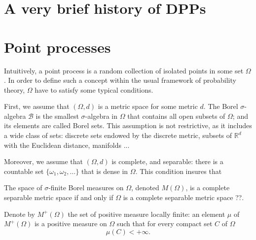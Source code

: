 \documentclass[twoside,11pt]{book}
\numberwithin{theorem}{chapter}
\numberwithin{definition}{chapter}
\numberwithin{proposition}{chapter}
\numberwithin{corollary}{chapter}
\numberwithin{example}{chapter}
\numberwithin{lemma}{chapter}
\begin{document}
\section{A very brief history of DPPs} 

\section{Point processes}\label{sec:pointprocesses}

Intuitively, a point process is a random collection of isolated points in some set $\Omega$. In order to define such a concept within the usual framework of probability theory, $\Omega$ have to satisfy some typical conditions. 

First, we assume that $(\Omega,d)$ is a metric space for some metric $d$. The Borel $\sigma$-algebra $\mathcal{B}$ is the smallest $\sigma$-algebra in $\Omega$ that contains all open subsets of $\Omega$; and its elements are called Borel sets. This assumption is not restrictive, as it includes a wide class of sets: discrete sets endowed by the discrete metric, subsets of $\mathbb{R}^{d}$ with the Euclidean distance, manifolds ... 

Moreover, we assume that $(\Omega,d)$ is complete, and separable: there is a countable set $\{\omega_{1}, \omega_{2}, \dots \}$ that is dense in $\Omega$. This condition insures that 



The space of $\sigma$-finite Borel measures on $\Omega$, denoted $M(\Omega)$, is a complete separable metric space if and only if $\Omega$ is a complete separable metric space \citep{Par05}??.


Denote by $M^{+}(\Omega)$ the set of positive measure locally finite: an element $\mu$ of $M^{+}(\Omega)$ is a positive measure on $\Omega$ such that for every compact set $C$ of $\Omega$
\begin{equation}
\mu(C) <+\infty.
\end{equation}
\end{document}
